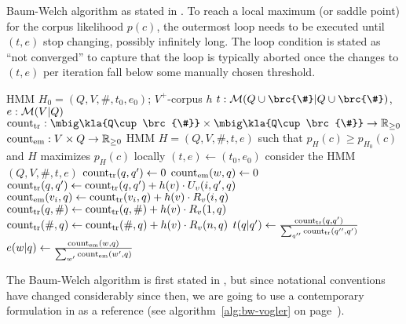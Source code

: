 \begin{algorithm}[p!]
 \caption{Baum-Welch algorithm as stated in \cite{vogler2015}. To reach a local
 maximum (or saddle point) for the corpus likelihood $p(c)$, the outermost loop
 needs to be executed until $(t,e)$ stop changing, possibly infinitely long.
 The loop condition is stated as ``not converged'' to capture that the loop is
 typically aborted once the changes to $(t,e)$ per iteration fall below some
 manually chosen threshold. \label{alg:bw-vogler}}
 \begin{algorithmic}[1]
  \algorithmheader[Input:] HMM $H_0 = (Q,V,\#,t_0,e_0)$; $V^+$-corpus $h$
  \algorithmheader[Variables:] $t:\um(Q\cup\brc{\#}|Q\cup\brc{\#})$, $e:\mathcal M(V|Q)$
  \algorithmheader             $\cnt_\mathrm{tr}: \mbig\kla{Q\cup\brc{\#}}\times\mbig\kla{Q\cup\brc{\#}}\to\zr_{\geq0}$
  \algorithmheader             $\operatorname{count}_\mathrm{em}: V\times Q\to\mathbb R_{\geq0}$
  \algorithmheader[Output:] HMM $H = (Q,V,\#,t,e)$
  \algorithmheader such that $p_H(c) \geq p_{H_0}(c)$ and $H$ maximizes $p_H(c)$ locally
  \STATE $(t,e) \leftarrow (t_0,e_0)$
   \STATE consider the HMM $(Q,V,\#,t,e)$
   \STATE $\operatorname{count}_\mathrm{tr}(q,q') \leftarrow 0$ 
   \STATE $\operatorname{count}_\mathrm{em}(w,q) \leftarrow 0$ 
      \STATE $\operatorname{count}_\mathrm{tr}(q,q') \leftarrow \operatorname{count}_\mathrm{tr}(q,q') + h(v) \cdot U_v(i,q',q)$
     \ENDFOR
    \ENDFOR
      \STATE $\operatorname{count}_\mathrm{em}(v_i,q) \leftarrow \operatorname{count}_\mathrm{tr}(v_i,q) + h(v) \cdot R_v(i,q)$
     \ENDFOR
    \ENDFOR
     \STATE $\operatorname{count}_\mathrm{tr}(q,\#) \leftarrow \operatorname{count}_\mathrm{tr}(q,\#) + h(v) \cdot R_v(1,q)$
     \STATE $\operatorname{count}_\mathrm{tr}(\#,q) \leftarrow \operatorname{count}_\mathrm{tr}(\#,q) + h(v) \cdot R_v(n,q)$
    \ENDFOR
   \ENDFOR
    \STATE $t(q|q') \leftarrow \frac{\operatorname{count}_\mathrm{tr}(q,q')}{\sum_{q''} \operatorname{count}_\mathrm{tr}(q'',q')}$
   \ENDFOR
    \STATE $e(w|q) \leftarrow \frac{\operatorname{count}_\mathrm{em}(w,q)}{\sum_{w'} \operatorname{count}_\mathrm{em}(w',q)}$
   \ENDFOR
  \ENDWHILE
 \end{algorithmic}
\end{algorithm}

The Baum-Welch algorithm is first stated in \cite{baupetsouwei70}, but since
notational conventions have changed considerably since then, we are going to
use a contemporary formulation in \cite{vogler2015} as a reference (see
algorithm~\ref{alg:bw-vogler} on page~\pageref{alg:bw-vogler}).

